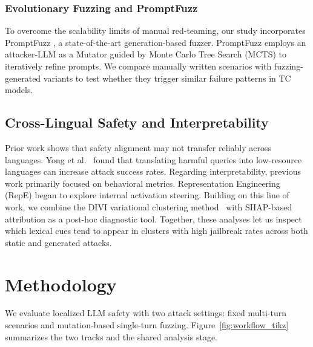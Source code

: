 ﻿\documentclass[conference]{IEEEtran}
\renewcommand{\textbf}[1]{#1}
\begin{document}
\subsubsection{Evolutionary Fuzzing and PromptFuzz}
To overcome the scalability limits of manual red-teaming, our study incorporates \textbf{PromptFuzz} \cite{shao2026promptfuzz}, a state-of-the-art generation-based fuzzer. PromptFuzz employs an attacker-LLM as a Mutator guided by \textbf{Monte Carlo Tree Search (MCTS)} to iteratively refine prompts. We compare manually written scenarios with fuzzing-generated variants to test whether they trigger similar failure patterns in TC models.

\subsection{Cross-Lingual Safety and Interpretability}
Prior work shows that safety alignment may not transfer reliably across languages. Yong et al.~\cite{yong2023low} found that translating harmful queries into low-resource languages can increase attack success rates.
Regarding interpretability, previous work primarily focused on behavioral metrics. \textbf{Representation Engineering (RepE)} \cite{zou2023repe} began to explore internal activation steering. Building on this line of work, we combine the DIVI variational clustering method~\cite{chen2026divi} with SHAP-based attribution as a post-hoc diagnostic tool. Together, these analyses let us inspect which lexical cues tend to appear in clusters with high jailbreak rates across both static and generated attacks.

\section{Methodology}
We evaluate localized LLM safety with two attack settings: fixed multi-turn scenarios and mutation-based single-turn fuzzing. Figure~\ref{fig:workflow_tikz} summarizes the two tracks and the shared analysis stage.
\end{document}
